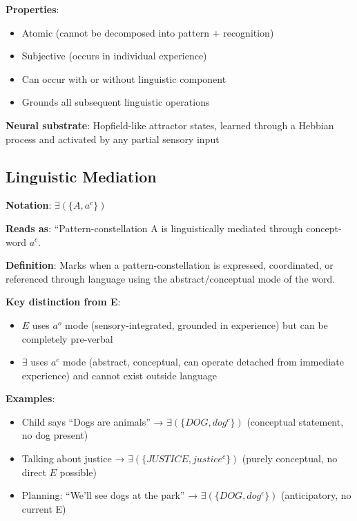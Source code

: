 \documentclass[12pt]{article}
\providecommand{\tightlist}{}   %
\begin{document}
\textbf{Properties}:

\begin{itemize}
\tightlist
\item
  Atomic (cannot be decomposed into pattern + recognition)
\item
  Subjective (occurs in individual experience)
\item
  Can occur with or without linguistic component
\item
  Grounds all subsequent linguistic operations
\end{itemize}

\textbf{Neural substrate}: Hopfield-like attractor states, learned through a Hebbian process and activated by any partial sensory input

\subsection{Linguistic Mediation}\label{linguistic-mediation}

\textbf{Notation}: \(\exists(\{A, a^c\})\)

\textbf{Reads as}: ``Pattern-constellation A is linguistically mediated through concept-word \(a^c\).

\textbf{Definition}: Marks when a pattern-constellation is expressed, coordinated, or referenced through language using the abstract/conceptual mode of the word.

\textbf{Key distinction from E}:

\begin{itemize}
\tightlist
\item
  \(E\) uses \(a^o\) mode (sensory-integrated, grounded in experience) but can be completely pre-verbal
\item
  \(\exists\) uses \(a^c\) mode (abstract, conceptual, can operate detached from immediate experience) and cannot exist outside language
\end{itemize}

\textbf{Examples}:

\begin{itemize}
\tightlist
\item
  Child says ``Dogs are animals'' → \(\exists(\{DOG, dog^c\})\) (conceptual statement, no dog present)
\item
  Talking about justice → \(\exists(\{JUSTICE, justice^c\})\) (purely conceptual, no direct \(E\) possible)
\item
  Planning: ``We'll see dogs at the park'' → \(\exists(\{DOG, dog^c\})\) (anticipatory, no current E)
\end{itemize}
\end{document}
